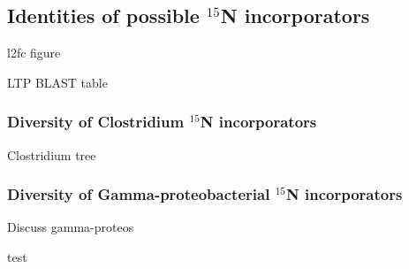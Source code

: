 \subsection{Identities of possible $^{15}$N incorporators}

l2fc figure

LTP BLAST table

\subsubsection{Diversity of Clostridium $^{15}$N incorporators}

Clostridium tree

\subsubsection{Diversity of Gamma-proteobacterial $^{15}$N incorporators}

Discuss gamma-proteos

test



